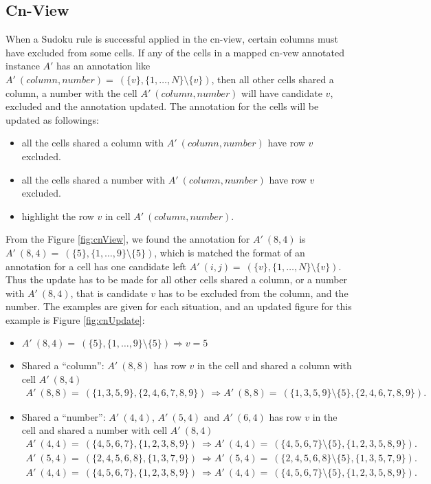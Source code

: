 \documentclass[11pt]{report}
\newcommand{\set}[1]{\{ #1 \}}
\begin{document}
\subsection{Cn-View}
\label{sec:basicrulecn}

When a Sudoku rule is successful applied in the cn-view, certain columns must have excluded from some cells. If any of the cells in a mapped cn-vew annotated instance $A'$ has an annotation like $A'\ (column, number) =\ (\set{v}, \set{1,\dots,N} \setminus \set{v})$, then all other cells shared a column, a number with the cell $A'\ (column, number)$ will have candidate $v$, excluded and the annotation updated. The annotation for the cells will be updated as followings:
\begin{itemize}
\item all the cells shared a column with $A'\ (column, number)$ have row $v$ excluded.
\item all the cells shared a number with $A'\ (column, number)$ have row $v$ excluded.
\item highlight the row $v$ in cell $A'\ (column, number)$.
\end{itemize} 

From the Figure \ref{fig:cnView}, we found the annotation for $A'\ (8,4)$ is $A'\ (8, 4) =\ (\set{5}, \set{1, \dots, 9} \setminus \set{5})$, which is matched the format of an annotation for a cell has one candidate left $A'\ (i,j) =\ (\set{v}, \set{1,\dots,N} \setminus \set{v})$. Thus the update has to be made for all other cells shared a column, or a number with $A'\ (8,4)$, that is candidate $v$ has to be excluded from the column, and the number. The examples are given for each situation, and an updated figure for this example is Figure \ref{fig:cnUpdate}:
\begin{itemize}
\item $A'\ (8,4) =\ (\set{5}, \set{1, \dots, 9} \setminus \set{5}) \Rightarrow v = 5$
\item Shared a ``column'': $A'\ (8,8)$ has row $v$ in the cell and shared a column with cell $A'\ (8,4)$
\begin{eqnarray*}
A'\ (8,8) =\ (\set{1, 3, 5, 9}, \set{2, 4, 6, 7, 8, 9})\ \Rightarrow A'\ (8,8) =\ (\set{1, 3, 5, 9}\setminus \set{5}, \set{2, 4, 6, 7, 8, 9}).
\end{eqnarray*}
\item Shared a ``number'': $A'\ (4,4)$, $A'\ (5,4)$ and $A'\ (6,4)$ has row $v$ in the cell and shared a number with cell $A'\ (8,4)$
\begin{eqnarray*}
A'\ (4,4) =\ (\set{4, 5, 6, 7}, \set{1, 2, 3, 8, 9})\ \Rightarrow A'\ (4,4) =\ (\set{4, 5, 6, 7}\setminus \set{5}, \set{1, 2, 3, 5, 8, 9}).\\
A'\ (5,4) =\ (\set{2, 4, 5, 6, 8}, \set{1, 3, 7, 9})\ \Rightarrow A'\ (5,4) =\ (\set{2, 4, 5, 6, 8}\setminus \set{5}, \set{1, 3, 5, 7, 9}).\\
A'\ (4,4) =\ (\set{4, 5, 6, 7}, \set{1, 2, 3, 8, 9})\ \Rightarrow A'\ (4,4) =\ (\set{4, 5, 6, 7}\setminus \set{5}, \set{1, 2, 3, 5, 8, 9}).
\end{eqnarray*}
\end{itemize}
\end{document}
